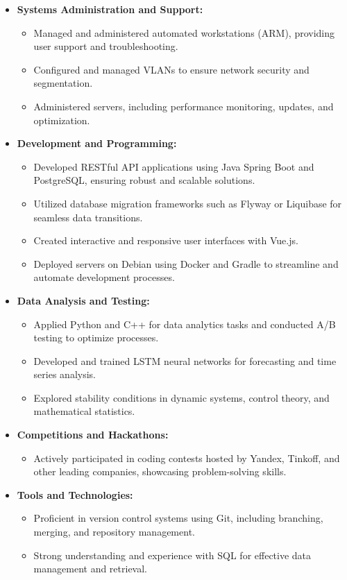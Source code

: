 \documentclass[a4paper,10pt]{article}
\begin{document}
\begin{itemize}
    \item \textbf{Systems Administration and Support:}
    \begin{itemize}
        \item Managed and administered automated workstations (ARM), providing user support and troubleshooting.
        \item Configured and managed VLANs to ensure network security and segmentation.
        \item Administered servers, including performance monitoring, updates, and optimization.
    \end{itemize}

    \item \textbf{Development and Programming:}
    \begin{itemize}
        \item Developed RESTful API applications using Java Spring Boot and PostgreSQL, ensuring robust and scalable solutions.
        \item Utilized database migration frameworks such as Flyway or Liquibase for seamless data transitions.
        \item Created interactive and responsive user interfaces with Vue.js.
        \item Deployed servers on Debian using Docker and Gradle to streamline and automate development processes.
    \end{itemize}

    \item \textbf{Data Analysis and Testing:}
    \begin{itemize}
        \item Applied Python and C++ for data analytics tasks and conducted A/B testing to optimize processes.
        \item Developed and trained LSTM neural networks for forecasting and time series analysis.
        \item Explored stability conditions in dynamic systems, control theory, and mathematical statistics.
    \end{itemize}

    \item \textbf{Competitions and Hackathons:}
    \begin{itemize}
        \item Actively participated in coding contests hosted by Yandex, Tinkoff, and other leading companies, showcasing problem-solving skills.
    \end{itemize}

    \item \textbf{Tools and Technologies:}
    \begin{itemize}
        \item Proficient in version control systems using Git, including branching, merging, and repository management.
        \item Strong understanding and experience with SQL for effective data management and retrieval.
    \end{itemize}
\end{itemize}
\end{document}
